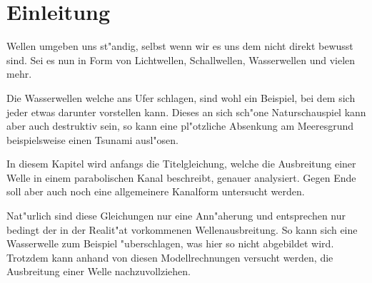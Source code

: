 \section{Einleitung}
Wellen umgeben uns st"andig, selbst wenn wir es uns dem nicht direkt bewusst 
sind. Sei es nun in Form von Lichtwellen, Schallwellen, Wasserwellen und vielen 
mehr.

Die Wasserwellen welche ans Ufer schlagen, sind wohl ein Beispiel, bei dem sich 
jeder etwas darunter vorstellen kann. Dieses an sich sch"one Naturschauspiel 
kann aber auch destruktiv sein, so kann eine pl"otzliche Absenkung am 
Meeresgrund beispielsweise einen Tsunami ausl"osen.

In diesem Kapitel wird anfangs die Titelgleichung, welche die Ausbreitung einer 
Welle in einem parabolischen Kanal beschreibt, genauer analysiert. Gegen Ende 
soll aber auch noch eine allgemeinere Kanalform untersucht werden.

Nat"urlich sind diese Gleichungen nur eine Ann"aherung und entsprechen nur 
bedingt der in der Realit"at vorkommenen Wellenausbreitung. So kann sich eine 
Wasserwelle zum Beispiel "uberschlagen, was hier so nicht abgebildet wird. 
Trotzdem kann anhand von diesen Modellrechnungen versucht werden, die 
Ausbreitung einer Welle nachzuvollziehen.
